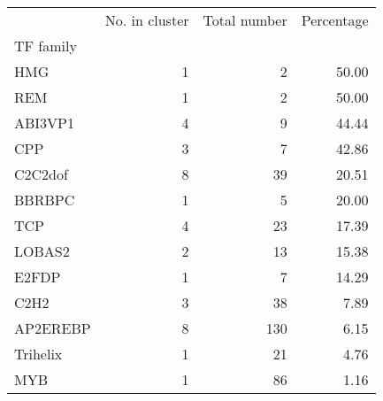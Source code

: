 \begin{tabular}{lrrr}
\toprule
{} &  No. in cluster &  Total number &  Percentage \\
TF family &                 &               &             \\
\midrule
HMG       &               1 &             2 &       50.00 \\
REM       &               1 &             2 &       50.00 \\
ABI3VP1   &               4 &             9 &       44.44 \\
CPP       &               3 &             7 &       42.86 \\
C2C2dof   &               8 &            39 &       20.51 \\
BBRBPC    &               1 &             5 &       20.00 \\
TCP       &               4 &            23 &       17.39 \\
LOBAS2    &               2 &            13 &       15.38 \\
E2FDP     &               1 &             7 &       14.29 \\
C2H2      &               3 &            38 &        7.89 \\
AP2EREBP  &               8 &           130 &        6.15 \\
Trihelix  &               1 &            21 &        4.76 \\
MYB       &               1 &            86 &        1.16 \\
\bottomrule
\end{tabular}
